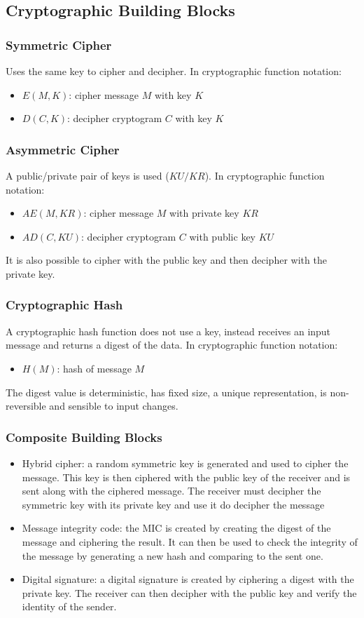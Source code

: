 \documentclass[10pt,a4paper]{report}
\begin{document}
\subsection{Cryptographic Building Blocks}
\subsubsection{Symmetric Cipher}
Uses the same key to cipher and decipher. In cryptographic function notation:
\begin{itemize}
\item $E(M,K)$: cipher message $M$ with key $K$
\item $D(C,K)$: decipher cryptogram $C$ with key $K$
\end{itemize}
\subsubsection{Asymmetric Cipher}
A public/private pair of keys is used ($KU/KR$). In cryptographic function notation:
\begin{itemize}
\item $AE(M, KR)$: cipher message $M$ with private key $KR$
\item $AD(C, KU)$: decipher cryptogram $C$ with public key $KU$
\end{itemize}
It is also possible to cipher with the public key and then decipher with the private key.
\subsubsection{Cryptographic Hash}
A cryptographic hash function does not use a key, instead receives an input message and returns a digest of the data. In cryptographic function notation:
\begin{itemize}
\item $H(M)$: hash of message $M$
\end{itemize}
The digest value is deterministic, has fixed size, a unique representation, is non-reversible and sensible to input changes.
\subsubsection{Composite Building Blocks}
\begin{itemize}
\item Hybrid cipher: a random symmetric key is generated and used to cipher the message. This key is then ciphered with the public key of the receiver and is sent along with the ciphered message. The receiver must decipher the symmetric key with its private key and use it do decipher the message
\item Message integrity code: the MIC is created by creating the digest of the message and ciphering the result. It can then be used to check the integrity of the message by generating a new hash and comparing to the sent one.
\item Digital signature: a digital signature is created by ciphering a digest with the private key. The receiver can then decipher with the public key and verify the identity of the sender.
\end{itemize}
\end{document}
